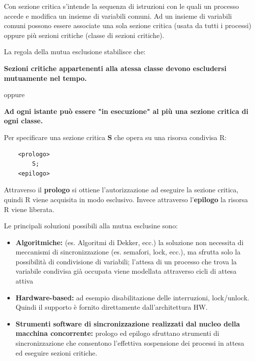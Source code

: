 \documentclass{article}
\begin{document}
\vspace{3mm}
Con sezione critica s'intende la sequenza di istruzioni con le quali un processo accede e modifica un insieme di variabili comuni. Ad un insieme di variabili comuni possono
essere associate una sola sezione critica (usata da tutti i processi) oppure più sezioni critiche (classe di sezioni critiche).

La regola della mutua esclusione stabilisce che:
\begin{center}
    \textbf{Sezioni critiche appartenenti alla atessa classe devono escludersi mutuamente nel tempo.}
    \vspace{3mm}

    oppure

    \vspace{3mm}
    \textbf{Ad ogni istante può essere "in esecuzione" al più una sezione critica di ogni classe.}
\end{center}

\vspace{3mm}
Per specificare una sezione critica \textbf{S} che opera su una risorsa condivisa R:

\begin{lstlisting}
    <prologo>
        S;
    <epilogo>
\end{lstlisting}

Attraverso il \textbf{prologo} si ottiene l'autorizzazione ad eseguire la sezione critica, quindi R viene acquisita in modo esclusivo. Invece attraverso l'\textbf{epilogo}
la risorsa R viene liberata.

\vspace{5mm}
Le principali soluzioni possibili alla mutua esclusine sono:
\begin{itemize}
    \item \textbf{Algoritmiche:} (es. Algoritmi di Dekker, ecc.) la soluzione non necessita di meccanismi di sincronizzazione (es. semafori, lock, ecc.), ma sfrutta
    solo la possibilità di condivisione di variabili; l'attesa di un processo che trova la variabile condivisa già occupata viene modellata attraverso cicli di attesa attiva
    \item \textbf{Hardware-based:} ad esempio disabilitazione delle interruzioni, lock/unlock. Quindi il supporto è fornito direttamente dall'architettura HW.
    \item \textbf{Strumenti software di sincronizzazione realizzati dal nucleo della macchina concorrente:} prologo ed epilogo sfruttano strumenti di sincronizzazione
    che consentono l'effettiva sospensione dei processi in attesa ed eseguire sezioni critiche.
\end{itemize}
\end{document}

